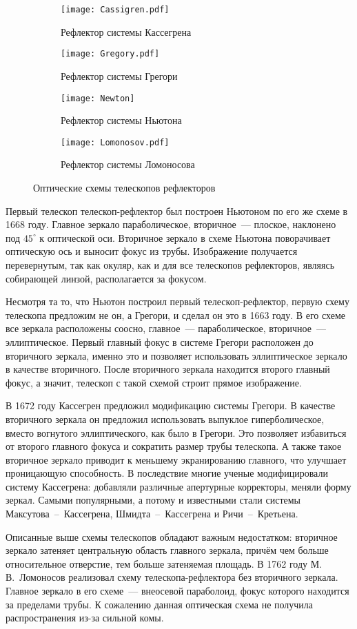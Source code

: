 \vspace{-.3pc}
\begin{figure}[h!]
	\begin{subfigure}{0.49\tw}
		\texttt{[image: Cassigren.pdf]}
		\caption{Рефлектор системы Кассегрена}
	\end{subfigure}
	\hfill
	\begin{subfigure}{0.49\tw}
		\texttt{[image: Gregory.pdf]}
		\caption{Рефлектор системы Грегори}
		\label{Gregory}
	\end{subfigure}
	\vskip4pt
	\begin{subfigure}{0.49\tw}
		\texttt{[image: Newton]}
		\caption{Рефлектор системы Ньютона}
	\end{subfigure}
	\hfill
	\begin{subfigure}{0.49\tw}
		\texttt{[image: Lomonosov.pdf]}
		\caption{Рефлектор системы Ломоносова}
	\end{subfigure}
	\caption{Оптические схемы телескопов рефлекторов}
\end{figure}

Первый телескоп телескоп-рефлектор был построен Ньютоном по его же схеме в 1668 году. Главное зеркало параболическое, вторичное~--- плоское, наклонено под $45^\circ$ к оптической оси. Вторичное зеркало в схеме Ньютона поворачивает оптическую ось и выносит фокус из трубы. Изображение получается перевернутым, так как окуляр, как и для все телескопов рефлекторов, являясь собирающей линзой, располагается за фокусом.

Несмотря та то, что Ньютон построил первый телескоп-рефлектор, первую схему телескопа предложим не он, а Грегори, и сделал он это в 1663 году. В его схеме все зеркала расположены соосно, главное~--- параболическое, вторичное~--- эллиптическое. Первый главный фокус в системе Грегори расположен до вторичного зеркала, именно это и позволяет использовать эллиптическое зеркало в качестве вторичного. После вторичного зеркала находится второго главный фокус, а значит, телескоп с такой схемой строит прямое изображение.

В 1672 году Кассегрен предложил модификацию системы Грегори. В качестве вторичного зеркала он предложил использовать выпуклое гиперболическое, вместо вогнутого эллиптического, как было в Грегори. Это позволяет избавиться от второго главного фокуса и сократить размер трубы телескопа. А также такое вторичное зеркало приводит к меньшему экранированию главного, что улучшает проницающую способность. В последствие многие ученые модифицировали систему Кассегрена: добавляли различные апертурные корректоры, меняли форму зеркал. Самыми популярными, а потому и известными стали системы Максутова~--~Кассегрена, Шмидта~--~Кассегрена и Ричи~--~Кретьена.

Описанные выше схемы телескопов обладают важным недостатком: вторичное зеркало затеняет центральную область главного зеркала, причём чем больше относительное отверстие, тем больше затеняемая площадь. В 1762 году М.\,В.~Ломоносов реализовал схему телескопа-реф\-лек\-тора без вторичного зеркала. Главное зеркало в его схеме~--- внеосевой параболоид, фокус которого находится за пределами трубы. К сожалению данная оптическая схема не получила распространения из-за сильной комы.


